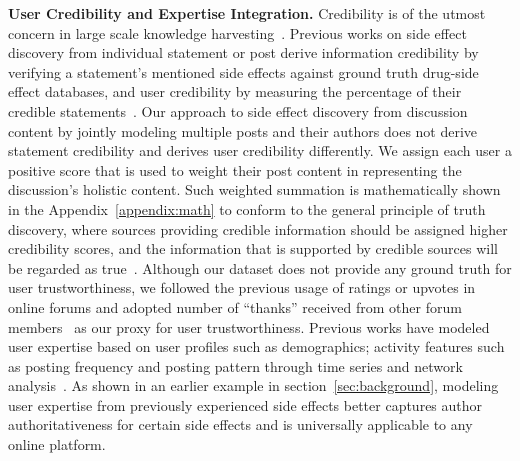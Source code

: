\documentclass{bmcart}
\begin{document}
{\bf User Credibility and Expertise Integration.}
Credibility is of the utmost concern in large scale knowledge harvesting~\cite{hajli2015credibility,mukherjee2015leveraging,popat2016credibility}. Previous works on side effect discovery from individual statement or post derive information credibility by verifying a statement's mentioned side effects against ground truth drug-side effect databases, and user credibility by measuring the percentage of their credible statements~\cite{mukherjee2014people,li2017reliable}. Our approach to side effect discovery from discussion content 
by jointly modeling
multiple posts and their authors does not derive statement credibility and derives user credibility differently. We assign each user a positive score that is used to weight their post content in representing the discussion's holistic content.
Such weighted summation is mathematically shown in the Appendix~\ref{appendix:math} to conform to the general principle of truth discovery, 
where sources providing credible information should be assigned higher credibility scores, and the information that is supported by credible sources will be
regarded as true~\cite{li2016survey}. Although our dataset does not provide any ground truth for user trustworthiness, we followed the previous usage of ratings or upvotes in online forums and adopted number of ``thanks'' received from other forum members~\cite{rains2009health} as our proxy for user trustworthiness. Previous works have modeled user expertise based on user profiles such as demographics; activity features such as posting frequency and posting pattern through time series and network analysis~\cite{mukherjee2014people, vydiswaran2019identifying}. As shown in an earlier example in section~\ref{sec:background}, modeling user expertise from previously experienced side effects better captures author authoritativeness for certain side effects and is universally applicable to any online platform. \\
\end{document}
